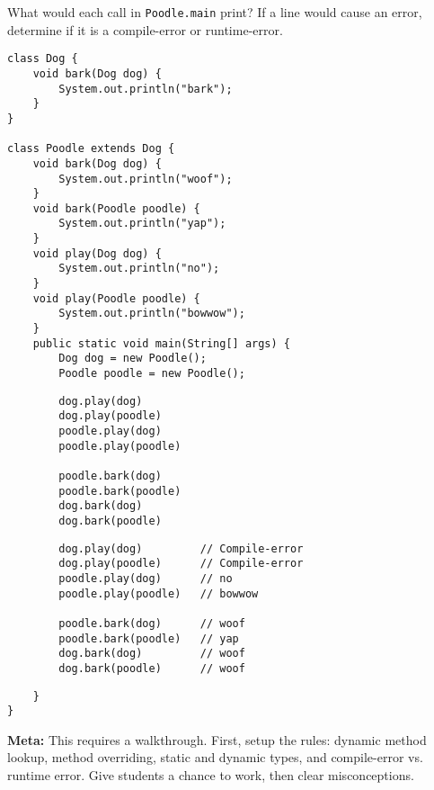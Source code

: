 \begin{blocksection}
\question What would each call in \lstinline$Poodle.main$ print? If a line
would cause an error, determine if it is a compile-error or runtime-error.

\begin{lstlisting}
class Dog {
    void bark(Dog dog) {
        System.out.println("bark");
    }
}

class Poodle extends Dog {
    void bark(Dog dog) {
        System.out.println("woof");
    }
    void bark(Poodle poodle) {
        System.out.println("yap");
    }
    void play(Dog dog) {
        System.out.println("no");
    }
    void play(Poodle poodle) {
        System.out.println("bowwow");
    }
    public static void main(String[] args) {
        Dog dog = new Poodle();
        Poodle poodle = new Poodle();
\end{lstlisting}

\ifprintanswers\else
\begin{lstlisting}
        dog.play(dog)
        dog.play(poodle)
        poodle.play(dog)
        poodle.play(poodle)

        poodle.bark(dog)
        poodle.bark(poodle)
        dog.bark(dog)
        dog.bark(poodle)
\end{lstlisting}
\fi

\begin{solution}
\begin{lstlisting}
        dog.play(dog)         // Compile-error
        dog.play(poodle)      // Compile-error
        poodle.play(dog)      // no
        poodle.play(poodle)   // bowwow

        poodle.bark(dog)      // woof
        poodle.bark(poodle)   // yap
        dog.bark(dog)         // woof
        dog.bark(poodle)      // woof
\end{lstlisting}
\end{solution}

\begin{lstlisting}
    }
}
\end{lstlisting}
\end{blocksection}

\begin{solution}
\textbf{Meta:} This requires a walkthrough. First, setup the rules: dynamic
method lookup, method overriding, static and dynamic types, and compile-error
vs. runtime error. Give students a chance to work, then clear misconceptions.
\end{solution}
